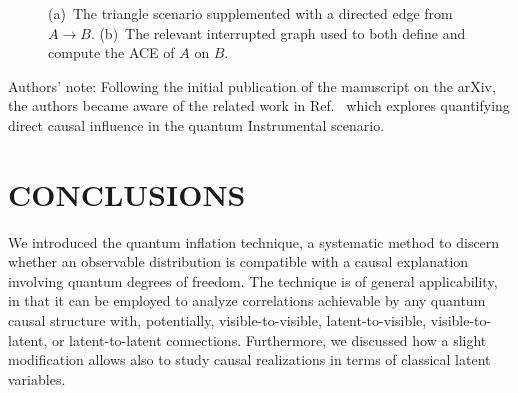 \documentclass[superscriptaddress,aps,prx,nofootinbib,twocolumn,twoside,reprint,letterpaper,longbibliography]{revtex4-2}
\begin{document}
\begin{figure}[t]
  \begin{center}
    \hfill
  \end{center}
  \caption[]{ %
  (a)~The triangle scenario supplemented with a directed edge from $A\to B$.
  (b)~The relevant interrupted graph used to both define and compute the ACE of $A$ on $B$. %
  \label{fig:triangleintervention}
  }
\end{figure}

Authors' note: Following the initial publication of the manuscript on the arXiv, the authors became aware of the related work in Ref.~\cite{Quantifying2020} which explores quantifying direct causal influence in the quantum Instrumental scenario.

\section{CONCLUSIONS}\label{sec:conclusions}
We introduced the quantum inflation technique, a systematic method to discern whether an observable distribution is compatible with a causal explanation involving quantum degrees of freedom.
The technique is of general applicability, in that it can be employed to analyze correlations achievable by any quantum causal structure with, potentially, visible-to-visible, latent-to-visible, visible-to-latent, or latent-to-latent connections.
Furthermore, we discussed how a slight modification allows also to study causal realizations in terms of classical latent variables.
\end{document}
